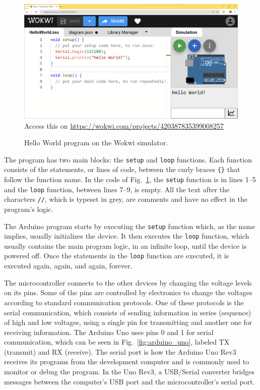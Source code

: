 \begin{figure}[t]
  \begin{wide}
    \includegraphics[width=\textwidth]{img/wokwi-hello.png}
    \\ \scriptsize
    Access this on \url{https://wokwi.com/projects/420387835399008257}
    \caption{Hello World program on the Wokwi simulator.}
    \label{fig:wokwi-hello}
  \end{wide}
\end{figure}

The program has two main blocks: the \texttt{setup} and \texttt{loop} functions.
Each function consists of the statements, or lines of code, between the curly braces \texttt{\{\}} that follow the function name.
In the code of Fig.~\ref{fig:wokwi-hello}, the \texttt{setup} function is in lines 1--5 and the \texttt{loop} function, between lines 7--9, is empty.
All the text after the characters \texttt{//}, which is typeset in grey, are comments and have no effect in the program's logic.

The Arduino program starts by executing the \texttt{setup} function which, as the name implies, usually initializes the device.
It then executes the \texttt{loop} function, which usually contains the main program logic, in an infinite loop, until the device is powered off.
Once the statements in the \texttt{loop} function are executed, it is executed again, again, and again, forever.

The microcontroller connects to the other devices by changing the voltage levels on its pins.
Some of the pins are controlled by electronics to change the voltages according to standard communication protocols.
One of these protocols is the serial communication, which consists of sending information in series (sequence) of high and low voltages, using a single pin for transmitting and another one for receiving information.
The Arduino Uno uses pins 0 and 1 for serial communication, which can be seen in Fig.~\ref{fig:arduino_uno}, labeled TX (transmit) and RX (receive).
The serial port is how the Arduino Uno Rev3 receives its programs from the development computer and is commonly used to monitor or debug the program.
In the Uno Rev3, a USB/Serial converter bridges messages between the computer's USB port and the microcontroller's serial port.

